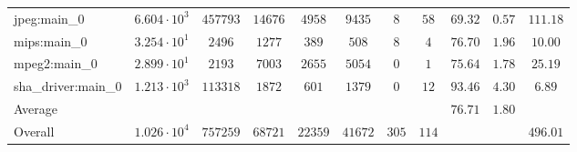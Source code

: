 \begin{tabular}{|l|c|c|c|c|c|c|c|c|c|c|}
jpeg:main\_0            & $ 6.604 \cdot 10^{3} $ & $ 457793 $ & $ 14676 $ & $ 4958  $ & $ 9435  $ & $ 8   $ & $ 58  $ & $ 69.32       $ & $ 0.57    $ & $ 111.18  $ \\
mips:main\_0            & $ 3.254 \cdot 10^{1} $ & $ 2496   $ & $ 1277  $ & $ 389   $ & $ 508   $ & $ 8   $ & $ 4   $ & $ 76.70       $ & $ 1.96    $ & $ 10.00   $ \\
mpeg2:main\_0           & $ 2.899 \cdot 10^{1} $ & $ 2193   $ & $ 7003  $ & $ 2655  $ & $ 5054  $ & $ 0   $ & $ 1   $ & $ 75.64       $ & $ 1.78    $ & $ 25.19   $ \\
sha\_driver:main\_0     & $ 1.213 \cdot 10^{3} $ & $ 113318 $ & $ 1872  $ & $ 601   $ & $ 1379  $ & $ 0   $ & $ 12  $ & $ 93.46       $ & $ 4.30    $ & $ 6.89    $ \\
\hline
Average                 & $                    $ & $        $ & $       $ & $       $ & $       $ & $     $ & $     $ & $ 76.71       $ & $ 1.80    $ & $         $ \\
\hline
Overall                 & $ 1.026 \cdot 10^{4} $ & $ 757259 $ & $ 68721 $ & $ 22359 $ & $ 41672 $ & $ 305 $ & $ 114 $ & $             $ & $         $ & $ 496.01  $ \\
\hline
\end{tabular}
